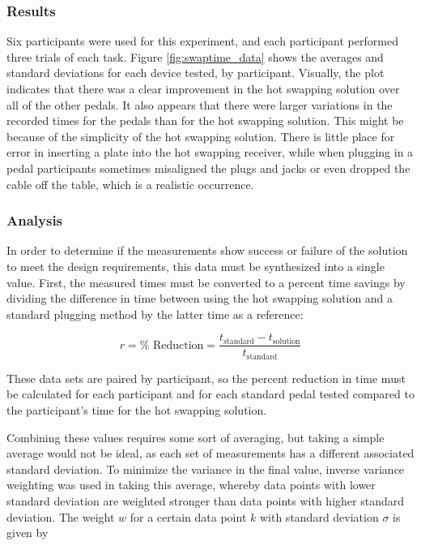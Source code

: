 		\subsubsection{Results}
		Six participants were used for this experiment, and each participant performed three trials of each task.  Figure \ref{fig:swaptime_data} shows the averages and standard deviations for each device tested, by participant.  Visually, the plot indicates that there was a clear improvement in the hot swapping solution over all of the other pedals.  It also appears that there were larger variations in the recorded times for the pedals than for the hot swapping solution.  This might be because of the simplicity of the hot swapping solution.  There is little place for error in inserting a plate into the hot swapping receiver, while when plugging in a pedal participants sometimes misaligned the plugs and jacks or even dropped the cable off the table, which is a realistic occurrence.


		\subsubsection{Analysis}
		In order to determine if the measurements show success or failure of the solution to meet the design requirements, this data must be synthesized into a single value.  First, the measured times must be converted to a percent time savings by dividing the difference in time between using the hot swapping solution and a standard plugging method by the latter time as a reference:

		$$ r = \% \text{ Reduction} = \frac{t_\text{standard} - t_\text{solution}}{t_\text{standard}} $$

		These data sets are paired by participant, so the percent reduction in time must be calculated for each participant and for each standard pedal tested compared to the participant's time for the hot swapping solution.

		Combining these values requires some sort of averaging, but taking a simple average would not be ideal, as each set of measurements has a different associated standard deviation.  To minimize the variance in the final value, inverse variance weighting was used in taking this average, whereby data points with lower standard deviation are weighted stronger than data points with higher standard deviation.  The weight $w$ for a certain data point $k$ with standard deviation $\sigma$ is given by

